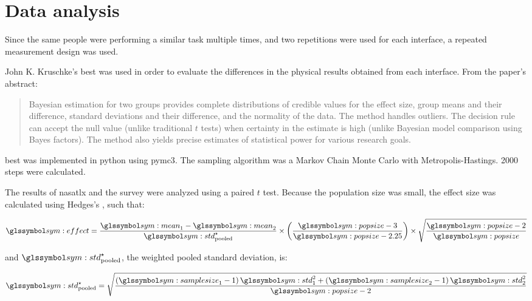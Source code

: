 \section{Data analysis}
  Since the same people were performing a similar task multiple times, and two repetitions were used for each interface, a repeated measurement design was used.
  
  John K. Kruschke's \gls{best}\cite{kruschke2013} was used in order to evaluate the differences in the physical results obtained from each interface.
  From the paper's abstract:
  
  \begin{quote}
    Bayesian estimation for two groups provides complete distributions of credible values for the effect size, group means and their difference, standard deviations and their difference, and the normality of the data.
    The method handles outliers.
    The decision rule can accept the null value (unlike traditional $t$ tests) when certainty in the estimate is high (unlike Bayesian model comparison using Bayes factors).
    The method also yields precise estimates of statistical power for various research goals.
  \end{quote}

  \gls{best} was implemented in \gls{python} using \gls{pymc3}.
  The sampling algorithm was a Markov Chain Monte Carlo with Metropolis-Hastings.
  2000 steps were calculated.

  The results of \gls{nasatlx} and the survey were analyzed using a paired $t$ test. Because the population size was small, the effect size was calculated using Hedges's , such that:

  \begin{equation}
    \sym{effect} = \frac{\sym{mean}_1 - \sym{mean}_2}{\sym{std}^\star_\mathrm{pooled}} \times \left(\frac{\sym{popsize} - 3}{\sym{popsize}-2.25}\right) \times \sqrt{\frac{\sym{popsize}-2}{\sym{popsize}}}
  \end{equation}

  \noindent and $\sym{std}^\star_\mathrm{pooled}$, the weighted pooled standard deviation, is:

  \begin{equation}
    \sym{std}^\star_\mathrm{pooled} = \sqrt{\frac{\left(\sym{samplesize}_1-1\right) \sym{std}_1^2 + \left(\sym{samplesize}_2-1\right)\sym{std}_2^2}{\sym{popsize}-2}}
  \end{equation}
